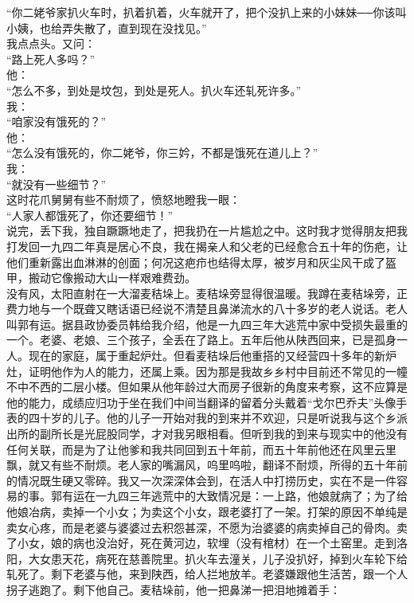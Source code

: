 “你二姥爷家扒火车时，扒着扒着，火车就开了，把个没扒上来的小妹妹──你该叫小姨，也给弄失散了，直到现在没找见。”\\

我点点头。又问：\\

“路上死人多吗？”\\

他：\\

“怎么不多，到处是坟包，到处是死人。扒火车还轧死许多。”\\

我：\\

“咱家没有饿死的？”\\

他：\\

“怎么没有饿死的，你二姥爷，你三妗，不都是饿死在道儿上？”\\

我：\\

“就没有一些细节？”\\

这时花爪舅舅有些不耐烦了，愤怒地瞪我一眼：\\

“人家人都饿死了，你还要细节！”\\

说完，丢下我，独自蹶蹶地走了，把我扔在一片尴尬之中。这时我才觉得朋友把我打发回一九四二年真是居心不良，我在揭亲人和父老的已经愈合五十年的伤疤，让他们重新露出血淋淋的创面；何况这疤疖也结得太厚，被岁月和灰尘风干成了盔甲，搬动它像搬动大山一样艰难费劲。\\

没有风，太阳直射在一大溜麦秸垛上。麦秸垛旁显得很温暖。我蹲在麦秸垛旁，正费力地与一个既聋又瞎话语已经说不清楚且鼻涕流水的八十多岁的老人说话。老人叫郭有运。据县政协委员韩给我介绍，他是一九四三年大逃荒中家中受损失最重的一个。老婆、老娘、三个孩子，全丢在了路上。五年后他从陕西回来，已是孤身一人。现在的家庭，属于重起炉灶。但看麦秸垛后他重搭的又经营四十多年的新炉灶，证明他作为人的能力，还属上乘。因为那是我故乡乡村中目前还不常见的一幢不中不西的二层小楼。但如果从他年龄过大而房子很新的角度来考察，这不应算是他的能力，成绩应归功于坐在我们中间当翻译的留着分头戴着“戈尔巴乔夫”头像手表的四十岁的儿子。他的儿子一开始对我的到来并不欢迎，只是听说我与这个乡派出所的副所长是光屁股同学，才对我另眼相看。但听到我的到来与现实中的他没有任何关联，而是为了让他爹和我共同回到五十年前，而五十年前他还在风里云里飘，就又有些不耐烦。老人家的嘴漏风，呜里呜啦，翻译不耐烦，所得的五十年前的情况既生硬又零碎。我又一次深深体会到，在活人中打捞历史，实在不是一件容易的事。郭有运在一九四三年逃荒中的大致情况是：一上路，他娘就病了；为了给他娘冶病，卖掉一个小女；为卖这个小女，跟老婆打了一架。打架的原因不单纯是卖女心疼，而是老婆与婆婆过去积怨甚深，不愿为治婆婆的病卖掉自己的骨肉。卖了小女，娘的病也没治好，死在黄河边，软埋（没有棺材）在一个土窑里。走到洛阳，大女患天花，病死在慈善院里。扒火车去潼关，儿子没扒好，掉到火车轮下给轧死了。剩下老婆与他，来到陕西，给人拦地放羊。老婆嫌跟他生活苦，跟一个人拐子逃跑了。剩下他自己。麦秸垛前，他一把鼻涕一把泪地摊着手：\\

